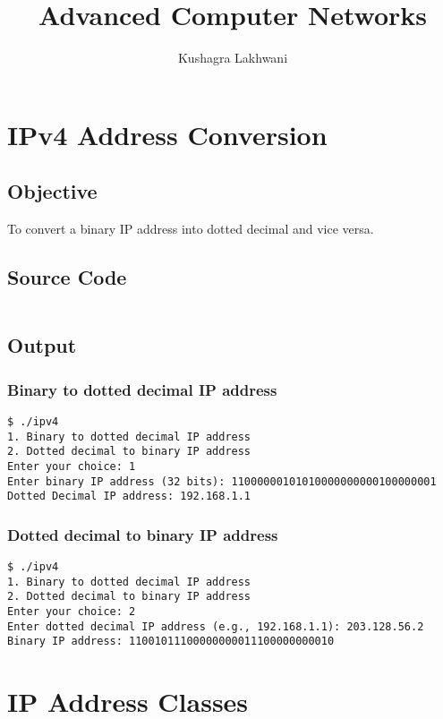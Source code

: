 \documentclass{korigamik}
\title{Advanced Computer Networks}
\author{Kushagra Lakhwani}
\begin{document}
\maketitle
\newpage



\thispagestyle{empty}
\tableofcontents
\newpage

\section{IPv4 Address Conversion}
\label{sec:ipv4}
\subsection*{Objective}
To convert a binary IP address into dotted decimal and vice versa.
\subsection*{Source Code}
\inputminted[firstline=5, lastline=39]{cpp}{code/ipv4.cpp}
\subsection*{Output}

\subsubsection*{Binary to dotted decimal IP address}
\begin{lstlisting}[style=output]
$ ./ipv4
1. Binary to dotted decimal IP address
2. Dotted decimal to binary IP address
Enter your choice: 1
Enter binary IP address (32 bits): 11000000101010000000000100000001
Dotted Decimal IP address: 192.168.1.1
\end{lstlisting}

\subsubsection*{Dotted decimal to binary IP address}

\begin{lstlisting}[style=output]
$ ./ipv4
1. Binary to dotted decimal IP address
2. Dotted decimal to binary IP address
Enter your choice: 2
Enter dotted decimal IP address (e.g., 192.168.1.1): 203.128.56.2
Binary IP address: 11001011100000000011100000000010
\end{lstlisting}

\section{IP Address Classes}
\label{sec:ipclass}
\end{document}

